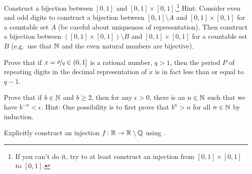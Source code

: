 \begin{exercise}[Challenging]
Construct a bijection between $[0,1]$ and $[0,1] \times [0,1]$.\footnote{%
If you can't do it, try to at least construct an injection from
$[0,1] \times [0,1]$ to
$[0,1]$.}
Hint:
Consider even and odd digits to construct a bijection between 
$[0,1] \setminus A$ and $[0,1] \times [0,1]$ for a countable set $A$ (be
careful about uniqueness of representation).
Then construct a bijection between $([0,1] \times [0,1]) \setminus B$
and $[0,1] \times [0,1]$ for a countable set $B$ (e.g.\ use 
that ${\mathbb{N}}$ and the even natural numbers are bijective).
\end{exercise}

\begin{exercise}
Prove that if $x = \nicefrac{p}{q} \in (0,1]$ is a rational number, $q > 1$,
then the period $P$ of repeating digits in the decimal representation
of $x$ is in fact less than or equal to $q-1$.
\end{exercise}

\begin{exercise} \label{exercise:bnlimit}
Prove that if $b \in {\mathbb{N}}$ and $b \geq 2$, then for any $\epsilon > 0$,
there is an $n \in {\mathbb{N}}$ such that 
we have $b^{-n} < \epsilon$.  Hint:
One possibility is to first prove that $b^n > n$ for all $n \in {\mathbb{N}}$ by induction.
\end{exercise}

\begin{exercise}
Explicitly construct an injection $f \colon {\mathbb{R}} \to {\mathbb{R}} \setminus {\mathbb{Q}}$ using
.
\end{exercise}
